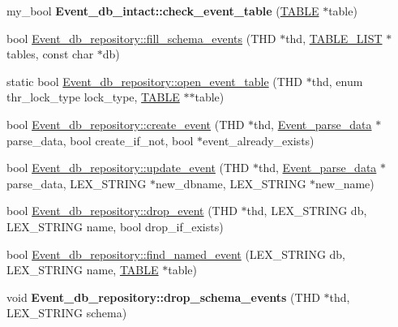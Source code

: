 \begin{DoxyCompactItemize}
\item 
\mbox{\label{group__Event__Scheduler_ga898458147e12c4def32734c4f82504df}} 
my\+\_\+bool {\bfseries Event\+\_\+db\+\_\+intact\+::check\+\_\+event\+\_\+table} (\mbox{\hyperlink{structTABLE}{T\+A\+B\+LE}} $\ast$table)
\item 
bool \mbox{\hyperlink{group__Event__Scheduler_ga6fa6828fbb74522072631b6d462b6772}{Event\+\_\+db\+\_\+repository\+::fill\+\_\+schema\+\_\+events}} (T\+HD $\ast$thd, \mbox{\hyperlink{structTABLE__LIST}{T\+A\+B\+L\+E\+\_\+\+L\+I\+ST}} $\ast$tables, const char $\ast$db)
\item 
static bool \mbox{\hyperlink{group__Event__Scheduler_ga019f518dd8c841d910161407064682c1}{Event\+\_\+db\+\_\+repository\+::open\+\_\+event\+\_\+table}} (T\+HD $\ast$thd, enum thr\+\_\+lock\+\_\+type lock\+\_\+type, \mbox{\hyperlink{structTABLE}{T\+A\+B\+LE}} $\ast$$\ast$table)
\item 
bool \mbox{\hyperlink{group__Event__Scheduler_gab5e75d43c08714c55b64116ab3e9eaed}{Event\+\_\+db\+\_\+repository\+::create\+\_\+event}} (T\+HD $\ast$thd, \mbox{\hyperlink{classEvent__parse__data}{Event\+\_\+parse\+\_\+data}} $\ast$parse\+\_\+data, bool create\+\_\+if\+\_\+not, bool $\ast$event\+\_\+already\+\_\+exists)
\item 
bool \mbox{\hyperlink{group__Event__Scheduler_ga2febaed952a7cc8253508b8ea0bc4516}{Event\+\_\+db\+\_\+repository\+::update\+\_\+event}} (T\+HD $\ast$thd, \mbox{\hyperlink{classEvent__parse__data}{Event\+\_\+parse\+\_\+data}} $\ast$parse\+\_\+data, L\+E\+X\+\_\+\+S\+T\+R\+I\+NG $\ast$new\+\_\+dbname, L\+E\+X\+\_\+\+S\+T\+R\+I\+NG $\ast$new\+\_\+name)
\item 
bool \mbox{\hyperlink{group__Event__Scheduler_ga70b022bf1055eb3251b9ff13c621e5c9}{Event\+\_\+db\+\_\+repository\+::drop\+\_\+event}} (T\+HD $\ast$thd, L\+E\+X\+\_\+\+S\+T\+R\+I\+NG db, L\+E\+X\+\_\+\+S\+T\+R\+I\+NG name, bool drop\+\_\+if\+\_\+exists)
\item 
bool \mbox{\hyperlink{group__Event__Scheduler_ga5ceeecadecac16417612be9384296bfd}{Event\+\_\+db\+\_\+repository\+::find\+\_\+named\+\_\+event}} (L\+E\+X\+\_\+\+S\+T\+R\+I\+NG db, L\+E\+X\+\_\+\+S\+T\+R\+I\+NG name, \mbox{\hyperlink{structTABLE}{T\+A\+B\+LE}} $\ast$table)
\item 
\mbox{\label{group__Event__Scheduler_ga22ccb5b4879da8bb6dd6aa5907295cc0}} 
void {\bfseries Event\+\_\+db\+\_\+repository\+::drop\+\_\+schema\+\_\+events} (T\+HD $\ast$thd, L\+E\+X\+\_\+\+S\+T\+R\+I\+NG schema)
$$
\end{DoxyCompactItemize}
